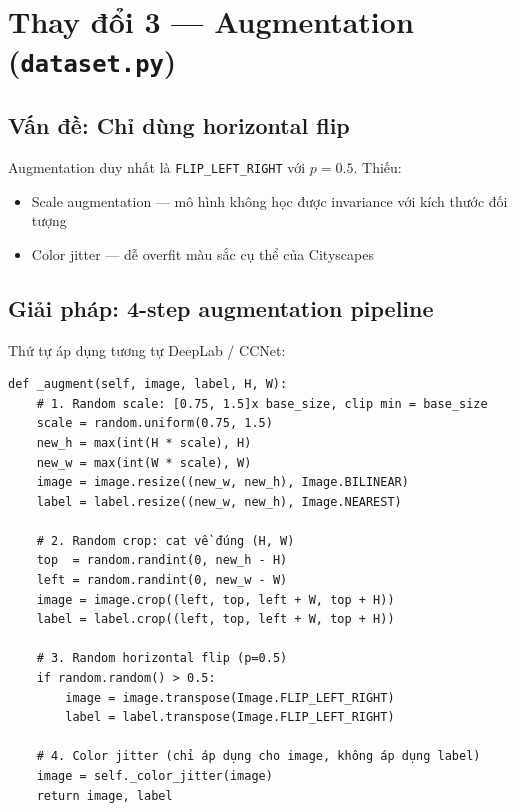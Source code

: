 \documentclass[12pt,a4paper]{article}
\begin{document}
\section{Thay đổi 3 — Augmentation (\texttt{dataset.py})}

\subsection{Vấn đề: Chỉ dùng horizontal flip}

Augmentation duy nhất là \texttt{FLIP\_LEFT\_RIGHT} với $p=0.5$. Thiếu:
\begin{itemize}
  \item Scale augmentation — mô hình không học được invariance với kích thước đối tượng
  \item Color jitter — dễ overfit màu sắc cụ thể của Cityscapes
\end{itemize}

\subsection{Giải pháp: 4-step augmentation pipeline}

Thứ tự áp dụng tương tự DeepLab / CCNet:

\begin{lstlisting}[caption={Pipeline augmentation mới (training only)}]
def _augment(self, image, label, H, W):
    # 1. Random scale: [0.75, 1.5]x base_size, clip min = base_size
    scale = random.uniform(0.75, 1.5)
    new_h = max(int(H * scale), H)
    new_w = max(int(W * scale), W)
    image = image.resize((new_w, new_h), Image.BILINEAR)
    label = label.resize((new_w, new_h), Image.NEAREST)

    # 2. Random crop: cat về đúng (H, W)
    top  = random.randint(0, new_h - H)
    left = random.randint(0, new_w - W)
    image = image.crop((left, top, left + W, top + H))
    label = label.crop((left, top, left + W, top + H))

    # 3. Random horizontal flip (p=0.5)
    if random.random() > 0.5:
        image = image.transpose(Image.FLIP_LEFT_RIGHT)
        label = label.transpose(Image.FLIP_LEFT_RIGHT)

    # 4. Color jitter (chỉ áp dụng cho image, không áp dụng label)
    image = self._color_jitter(image)
    return image, label
\end{lstlisting}
\end{document}

